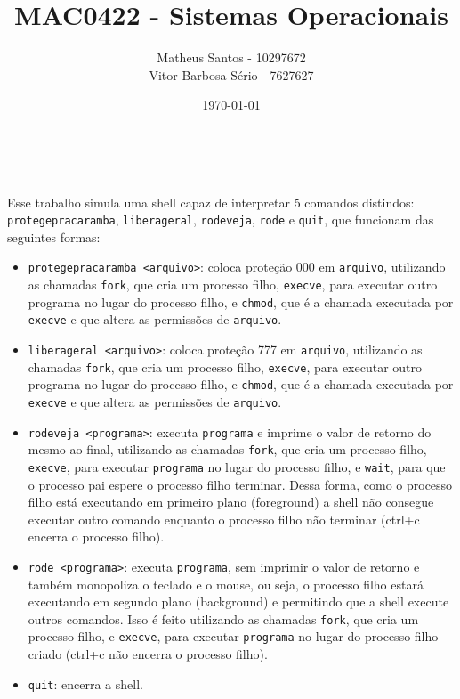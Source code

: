 \documentclass[12pt, a4paper]{article}
\title{MAC0422 - Sistemas Operacionais}
\author{Matheus Santos - 10297672 \\ Vitor Barbosa Sério - 7627627}
\date{\today}
\begin{document}
\makeatletter
\begin{flushright}
\@date
\end{flushright}
\begin{center}
{\Large \@title \\}
{\large \@author}
\end{center}
\makeatother

Esse trabalho simula uma shell capaz de interpretar 5 comandos distindos: \texttt{protegepracaramba}, \texttt{liberageral}, \texttt{rodeveja}, \texttt{rode} e \texttt{quit}, que funcionam das seguintes formas:

\begin{itemize}
\item \texttt{protegepracaramba <arquivo>}: coloca proteção 000 em \texttt{arquivo}, utilizando as chamadas \texttt{fork}, que cria um processo filho, \texttt{execve}, para executar outro programa no lugar do processo filho, e \texttt{chmod}, que é a chamada executada por \texttt{execve} e que altera as permissões de \texttt{arquivo}.


\item \texttt{liberageral <arquivo>}: coloca proteção 777 em \texttt{arquivo}, utilizando as chamadas \texttt{fork}, que cria um processo filho, \texttt{execve}, para executar outro programa no lugar do processo filho, e \texttt{chmod}, que é a chamada executada por \texttt{execve} e que altera as permissões de \texttt{arquivo}.


\item \texttt{rodeveja <programa>}: executa \texttt{programa} e imprime o valor de retorno do mesmo ao final, utilizando as chamadas \texttt{fork}, que cria um processo filho, \texttt{execve}, para executar \texttt{programa} no lugar do processo filho, e \texttt{wait}, para que o processo pai espere o processo filho terminar. Dessa forma, como o processo filho está executando em primeiro plano (foreground) a shell não consegue executar outro comando enquanto o processo filho não terminar (ctrl+c encerra o processo filho).
\item \texttt{rode <programa>}: executa \texttt{programa}, sem imprimir o valor de retorno e também monopoliza o teclado e o mouse, ou seja, o processo filho estará executando em segundo plano (background) e permitindo que a shell execute outros comandos. Isso é feito utilizando as chamadas \texttt{fork}, que cria um processo filho, e \texttt{execve}, para executar \texttt{programa} no lugar do processo filho criado (ctrl+c não encerra o processo filho).
\item \texttt{quit}: encerra a shell.
\end{itemize}
\end{document}
